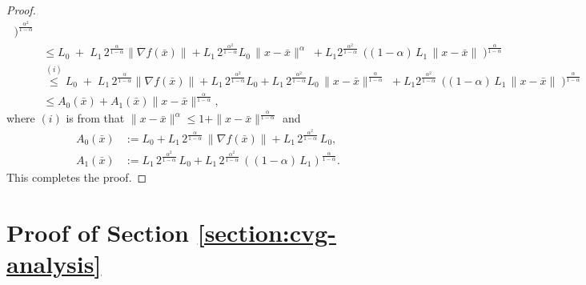 \documentclass{article}
\begin{document}
\begin{proof}
\begin{align*}
\;\Biggr)^{\frac{\alpha^2}{1-\alpha}}\\
&\leq L_0 \;+\;L_1\,2^\frac{\alpha}{1-\alpha}\|\nabla f(\bar x)\| + L_1\,2^\frac{\alpha^2}{1-\alpha}L_0\,\|x-\bar x\|^\alpha
\;+L_1 2^\frac{\alpha^2}{1-\alpha}\,\;\Biggr((1-\alpha)\,L_1\,\|x-\bar x\|
\;\Biggr)^{\frac{\alpha}{1-\alpha}}\\
&\overset{(i)}{\leq} 
L_0 \;+\;L_1\,2^\frac{\alpha}{1-\alpha}\|\nabla f(\bar x)\| + L_1\,2^\frac{\alpha^2}{1-\alpha}L_0+L_1\,2^\frac{\alpha^2}{1-\alpha}L_0\,\|x-\bar x\|^{\frac{\alpha}{1-\alpha}}
\;+L_1 2^\frac{\alpha^2}{1-\alpha}\,\;\Biggr((1-\alpha)\,L_1\,\|x-\bar x\|
\;\Biggr)^{\frac{\alpha}{1-\alpha}}\\
& \leq A_0(\bar{x})+A_1(\bar{x})\|x-\bar{x}\|^{\frac{\alpha}{1-\alpha}},
\end{align*}
where $(i)$ is from that $\|x-\bar x\|^\alpha \leq 1+\|x-\bar x\|^{\frac{\alpha}{1-\alpha}}$
and 
\[
\begin{aligned}
A_0(\bar{x}) &:= L_0 
+ L_1\,2^{\tfrac{\alpha}{1-\alpha}}\,\|\nabla f(\bar{x})\| 
+ L_1\,2^{\tfrac{\alpha^2}{1-\alpha}}\,L_0, \\
A_1(\bar{x}) &:= L_1\,2^{\tfrac{\alpha^2}{1-\alpha}}\,L_0 
+ L_1\,2^{\tfrac{\alpha^2}{1-\alpha}}\,\left((1-\alpha)\,L_1\right)^{\tfrac{\alpha}{1-\alpha}}.
\end{aligned}
\]
This completes the proof.
\end{proof}



\section{Proof of Section \ref{section:cvg-analysis}}
\end{document}
